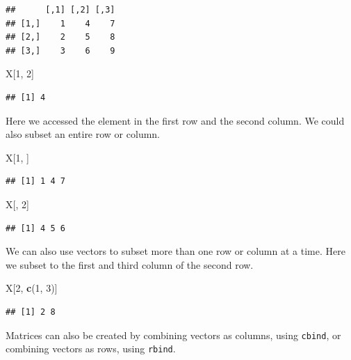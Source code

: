 \documentclass[]{book}
\newenvironment{Shaded}{\begin{snugshade}}{\end{snugshade}}
\newcommand{\KeywordTok}[1]{\textcolor[rgb]{0.13,0.29,0.53}{\textbf{#1}}}
\newcommand{\DecValTok}[1]{\textcolor[rgb]{0.00,0.00,0.81}{#1}}
\newcommand{\NormalTok}[1]{#1}
\theoremstyle{definition}
\theoremstyle{definition}
\theoremstyle{definition}
\theoremstyle{remark}
\begin{document}
\begin{verbatim}
##      [,1] [,2] [,3]
## [1,]    1    4    7
## [2,]    2    5    8
## [3,]    3    6    9
\end{verbatim}

\begin{Shaded}
\begin{Highlighting}[]
\NormalTok{X[}\DecValTok{1}\NormalTok{, }\DecValTok{2}\NormalTok{]}
\end{Highlighting}
\end{Shaded}

\begin{verbatim}
## [1] 4
\end{verbatim}

Here we accessed the element in the first row and the second column. We
could also subset an entire row or column.

\begin{Shaded}
\begin{Highlighting}[]
\NormalTok{X[}\DecValTok{1}\NormalTok{, ]}
\end{Highlighting}
\end{Shaded}

\begin{verbatim}
## [1] 1 4 7
\end{verbatim}

\begin{Shaded}
\begin{Highlighting}[]
\NormalTok{X[, }\DecValTok{2}\NormalTok{]}
\end{Highlighting}
\end{Shaded}

\begin{verbatim}
## [1] 4 5 6
\end{verbatim}

We can also use vectors to subset more than one row or column at a time.
Here we subset to the first and third column of the second row.

\begin{Shaded}
\begin{Highlighting}[]
\NormalTok{X[}\DecValTok{2}\NormalTok{, }\KeywordTok{c}\NormalTok{(}\DecValTok{1}\NormalTok{, }\DecValTok{3}\NormalTok{)]}
\end{Highlighting}
\end{Shaded}

\begin{verbatim}
## [1] 2 8
\end{verbatim}

Matrices can also be created by combining vectors as columns, using
\texttt{cbind}, or combining vectors as rows, using \texttt{rbind}.
\end{document}
